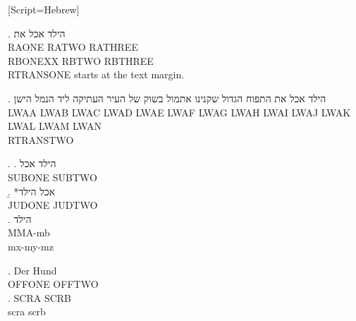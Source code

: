 
\newfontfamily{}[Script=Hebrew]

\GlossRTL

\ex. \glll הילד אכל את \\
           RAONE RATWO RATHREE \\
           RBONEXX RBTWO RBTHREE \\
\glt RTRANSONE starts at the text margin.

\ex. \gll הילד אכל את התפוח הגדול שקנינו אתמול בשוק של העיר העתיקה ליד הנמל הישן \\
          LWAA LWAB LWAC LWAD LWAE LWAF LWAG LWAH LWAI LWAJ LWAK LWAL LWAM LWAN \\
\glt RTRANSTWO

\ex. \a. \gll הילד אכל \\ SUBONE SUBTWO \\
     \b. *\gll אכל הילד \\ JUDONE JUDTWO \\

\GlossMorphAlign
\ex. \glll הילד \\ MMA-mb \\
          mx-my-mz \\
\GlossMorphAlignOff

\GlossRTLOff
{}
\ex. \gll Der Hund \\ OFFONE OFFTWO \\

\ex. 
\gll SCRA SCRB \\ scra scrb \\


